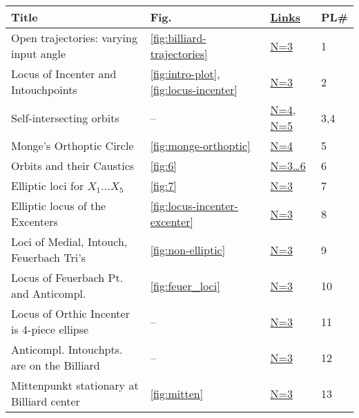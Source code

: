 \begin{table}[H]
\begin{tabular}{llll}
Title & Fig. & \href{https://bit.ly/2kTvPPr}{Links} & PL\#\\
\hline
{Open trajectories: varying input angle} &
\ref{fig:billiard-trajectories} &
\href{https://youtu.be/A7mPzrNJHkA}{N=3} &
{1} \\ 

{Locus of Incenter and Intouchpoints} &
\ref{fig:intro-plot},\ref{fig:locus-incenter} &
\href{https://www.youtube.com/watch?v=9xU6T7hQMzs}{N=3} &
{2}\\

{Self-intersecting orbits} &
-- &
\href{https://youtu.be/cCYxN7ueGV4}{N=4}, \href{https://youtu.be/ECe4DptduJY}{N=5} &
{3,4} \\

{Monge's Orthoptic Circle} &
\ref{fig:monge-orthoptic} & 
\href{https://youtu.be/9fI3iM2jrmI}{N=4} &
{5} \\

{Orbits and their Caustics} &
\ref{fig:6} &
\href{https://youtu.be/Y3q35DObfZU}{N=3\ldots{6}}& 
{6} \\

{Elliptic loci for $X_1\ldots{X_5}$} &
\ref{fig:7} & 
\href{https://youtu.be/sMcNzcYaqtg}{N=3} &
{7} \\

{Elliptic locus of the Excenters} &
\ref{fig:locus-incenter-excenter} &
\href{https://youtu.be/Xxr1DUo19_w}{N=3} &
{8} \\

{Loci of Medial, Intouch, Feuerbach Tri's} &
\ref{fig:non-elliptic} &
\href{https://youtu.be/OGvCQbYqJyI}{N=3} &
{9} \\

{Locus of Feuerbach Pt. and Anticompl.} &
\ref{fig:feuer_loci} &
\href{https://youtu.be/TXdg7tUl8lc}{N=3} &
{10} \\
 
{Locus of Orthic Incenter is 4-piece ellipse} &
-- &
\href{https://youtu.be/3qJnwpFkUFQ}{N=3} &
{11} \\

{Anticompl. Intouchpts. are on the Billiard} &
-- &
\href{https://youtu.be/50dyxWJhfN4}{N=3} & 
{12} \\

{Mittenpunkt stationary at Billiard center} & \ref{fig:mitten} &
\href{https://youtu.be/tMrBqfRBYik}{N=3} &
{13} \\


\end{tabular}
\end{table}
